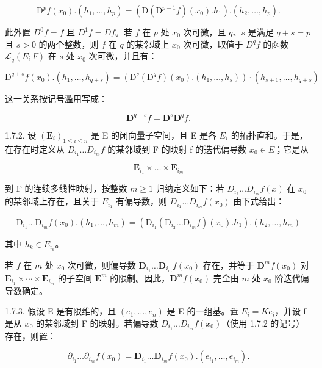 \[
\mathrm{D} ^ {p} f (x _ {0}). (h _ {1}, \dots , h _ {p}) = (\mathrm{D} (\mathrm{D} ^ {p - 1} f) (x _ {0}). h _ {1}). (h _ {2}, \dots , h _ {p}).
\]

此外置 \(D^{0}f = f\) 且 \(D^{1}f = Df\)。若 \(f\) 在 \(p\) 处 \(x_{0}\) 次可微，且 \(q\)、\(s\) 是满足 \(q + s = p\) 且 \(s > 0\) 的两个整数，则 \(f\) 在 \(q\) 的某邻域上 \(x_{0}\) 次可微，取值于 \(D^{q}f\) 的函数 \(\mathcal{L}_{q}(E; F)\) 在 \(s\) 处 \(x_{0}\) 次可微，并且有：

\[
\mathrm{D} ^ {q + s} f (x _ {0}). (h _ {1}, \dots , h _ {q + s}) = (\mathrm{D} ^ {s} (\mathrm{D} ^ {q} f) (x _ {0}). (h _ {1}, \dots , h _ {s})) \cdot (h _ {s + 1}, \dots , h _ {q + s})
\]

这一关系按记号滥用写成：

\[
\mathbf {D} ^ {q + s} f = \mathbf {D} ^ {s} \mathbf {D} ^ {q} f.
\]

1.7.2. 设 \((\mathbf{E}_{i})_{1\leqslant i\leqslant n}\) 是 E 的闭向量子空间，且 E 是各 \(E_{i}\) 的拓扑直和。于是，在存在时定义从 \(D_{i_{1}}\ldots D_{i_{m}}f\) 的某邻域到 F 的映射 f 的迭代偏导数 \(x_{0}\in E\)；它是从

\[
\mathbf {E} _ {i _ {1}} \times \dots \times \mathbf {E} _ {i _ {m}}
\]

到 F 的连续多线性映射，按整数 \(m \geqslant 1\) 归纳定义如下：若 \(D_{i_{2}} \ldots D_{i_{m}} f(x)\) 在 \(x_{0}\) 的某邻域上存在，且关于 \(E_{i_{1}}\) 有偏导数，则 \(D_{i_{1}} \ldots D_{i_{m}} f(x_{0})\) 由下式给出：

\[
\mathrm{D} _ {i _ {1}} \dots \mathrm{D} _ {i _ {m}} f (x _ {0}). (h _ {1}, \dots , h _ {m}) = (\mathrm{D} _ {i _ {1}} (\mathrm{D} _ {i _ {2}} \dots \mathrm{D} _ {i _ {m}} f) (x _ {0}). h _ {1}). (h _ {2}, \dots , h _ {m})
\]

其中 \(h_{k} \in E_{i_{k}}\)。

若 \(f\) 在 \(m\) 处 \(x_{0}\) 次可微，则偏导数 \(\mathbf{D}_{i_{1}}\ldots\mathbf{D}_{i_{m}}f(x_{0})\) 存在，并等于 \(\mathbf{D}^{m}f(x_{0})\) 对 \(\mathbf{E}_{i_{1}}\times\cdots\times\mathbf{E}_{i_{m}}\) 的子空间 \(\mathbf{E}^{m}\) 的限制。因此，\(\mathbf{D}^{m}f(x_{0})\) 完全由 \(m\) 处 \(x_{0}\) 阶迭代偏导数确定。

1.7.3. 假设 E 是有限维的，且 \((e_{1},\ldots,e_{n})\) 是 E 的一组基。置 \(E_{i}=Ke_{i}\)，并设 f 是从 \(x_{0}\) 的某邻域到 F 的映射。若偏导数 \(D_{i_{1}}\ldots D_{i_{m}}f(x_{0})\)（使用 1.7.2 的记号）存在，则置：

\[
\partial_ {i _ {1}} \dots \partial_ {i _ {m}} f (x _ {0}) = \mathbf {D} _ {i _ {1}} \dots \mathbf {D} _ {i _ {m}} f (x _ {0}). (e _ {i _ {1}}, \dots , e _ {i _ {m}}).
\]

